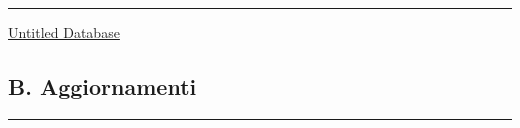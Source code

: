 \begin{center}\rule{0.5\linewidth}{0.5pt}\end{center}

\href{Untitled\%20Database\%20a55e9319918d439c8e425a299be97c3d.csv}{Untitled
Database}

\subsection{B. Aggiornamenti}\label{b.-aggiornamenti}

\begin{center}\rule{0.5\linewidth}{0.5pt}\end{center}

\href{Untitled\%20c80f6936cdaf4d19b2c69d1f3802947e.csv}{}
